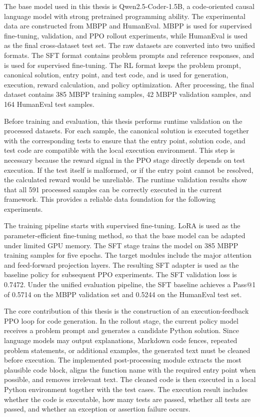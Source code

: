 \begin{digest}
The base model used in this thesis is Qwen2.5-Coder-1.5B, a code-oriented causal language model with strong pretrained programming ability. The experimental data are constructed from MBPP and HumanEval. MBPP is used for supervised fine-tuning, validation, and PPO rollout experiments, while HumanEval is used as the final cross-dataset test set. The raw datasets are converted into two unified formats. The SFT format contains problem prompts and reference responses, and is used for supervised fine-tuning. The RL format keeps the problem prompt, canonical solution, entry point, and test code, and is used for generation, execution, reward calculation, and policy optimization. After processing, the final dataset contains 385 MBPP training samples, 42 MBPP validation samples, and 164 HumanEval test samples.

Before training and evaluation, this thesis performs runtime validation on the processed datasets. For each sample, the canonical solution is executed together with the corresponding tests to ensure that the entry point, solution code, and test code are compatible with the local execution environment. This step is necessary because the reward signal in the PPO stage directly depends on test execution. If the test itself is malformed, or if the entry point cannot be resolved, the calculated reward would be unreliable. The runtime validation results show that all 591 processed samples can be correctly executed in the current framework. This provides a reliable data foundation for the following experiments.

The training pipeline starts with supervised fine-tuning. LoRA is used as the parameter-efficient fine-tuning method, so that the base model can be adapted under limited GPU memory. The SFT stage trains the model on 385 MBPP training samples for five epochs. The target modules include the major attention and feed-forward projection layers. The resulting SFT adapter is used as the baseline policy for subsequent PPO experiments. The SFT validation loss is 0.7472. Under the unified evaluation pipeline, the SFT baseline achieves a Pass@1 of 0.5714 on the MBPP validation set and 0.5244 on the HumanEval test set.

The core contribution of this thesis is the construction of an execution-feedback PPO loop for code generation. In the rollout stage, the current policy model receives a problem prompt and generates a candidate Python solution. Since language models may output explanations, Markdown code fences, repeated problem statements, or additional examples, the generated text must be cleaned before execution. The implemented post-processing module extracts the most plausible code block, aligns the function name with the required entry point when possible, and removes irrelevant text. The cleaned code is then executed in a local Python environment together with the test cases. The execution result includes whether the code is executable, how many tests are passed, whether all tests are passed, and whether an exception or assertion failure occurs.


\end{digest}
